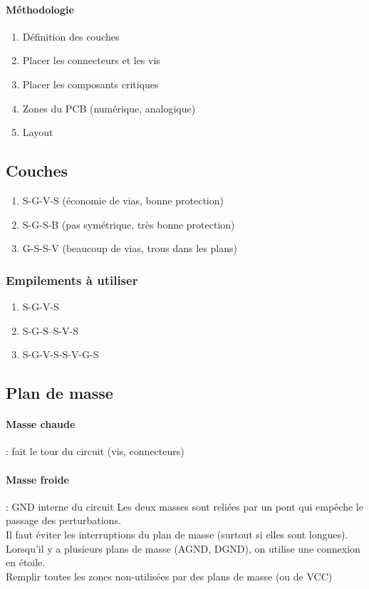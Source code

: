 \documentclass[resume]{subfiles}
\begin{document}
\begin{multicols}{3}
\paragraph{Méthodologie}
\begin{enumerate}
\item Définition des couches
\item Placer les connecteurs et les vis
\item Placer les composants critiques
\item Zones du PCB (numérique, analogique)
\item Layout
\end{enumerate}
\subsection{Couches}
\begin{enumerate}
\item S-G-V-S (économie de vias, bonne protection)
\item S-G-S-B (pas symétrique, très bonne protection)
\item G-S-S-V (beaucoup de vias, trous dans les plans)
\end{enumerate}
\subsubsection{Empilements à utiliser}
\begin{enumerate}
\item S-G-V-S
\item S-G-S--S-V-S
\item S-G-V-S-S-V-G-S
\end{enumerate}
\subsection{Plan de masse}
\paragraph{Masse chaude} : fait le tour du circuit (vis, connecteurs)
\paragraph{Masse froide} : GND interne du circuit
Les deux masses sont reliées par un pont qui empêche le passage des perturbations.\\
Il faut éviter les interruptions du plan de masse (surtout si elles sont longues).\\
Lorsqu'il y a plusieurs plans de masse (AGND, DGND), on utilise une connexion en étoile.\\
Remplir toutes les zones non-utilisées par des plans de masse (ou de VCC)

\end{multicols}
\end{document}
